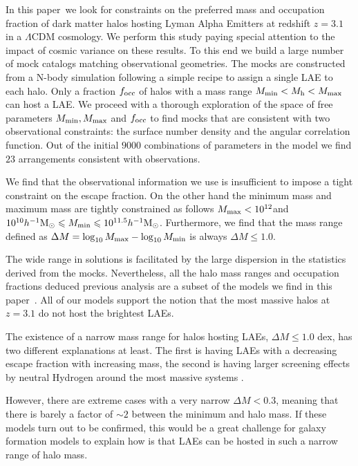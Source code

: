 \documentclass[usenatbib]{mn2e}
\newcommand{\documentname}{paper~}
\newcommand{\ly}{{\ifmmode{{\rm Ly}\alpha}\else{Ly$\alpha$~}\fi}}
\newcommand{\hMsun}{{\ifmmode{h^{-1}{\rm
        {M_{\odot}}}}\else{$h^{-1}{\rm{M_{\odot}}}$}\fi}}
\begin{document}
{In this \documentname we look for constraints on the preferred mass
and occupation fraction of dark matter halos hosting Lyman Alpha Emitters at
redshift $z=3.1$ in a $\Lambda$CDM cosmology. We perform this study
paying special attention to the impact of cosmic variance on these
results. To this end we build a large number of mock catalogs matching
observational geometries. The mocks are constructed from a N-body simulation
following a simple recipe to assign a single LAE to each halo. Only
a fraction $f_{\rm occ}$ of halos with a mass range  $M_{\rm
  min}<M_{\rm h}<M_{\rm   max}$ can host a LAE. We proceed with a
thorough exploration of the space of free parameters $M_{\rm min},
M_{\rm max}$ and $f_{\rm occ}$ to find mocks that are consistent with
two observational constraints: the surface number density and the
angular correlation function. Out of the initial $9000$ 
combinations of parameters in the model we find $23$ arrangements
consistent with observations.

We find that the observational information we use is insufficient to
impose a tight constraint on the escape fraction. On the other hand
the minimum mass and maximum mass are tightly constrained as follows
$M_{\rm max}<10^{12}$\hMsun and $10^{10}\hMsun\leq M_{\rm min}\leq
10^{11.5}\hMsun$. Furthermore, we find that the mass range defined as
$\Delta M=\log_{10}M_{\rm max} - \log_{10}M_{\rm min}$ is always
$\Delta M\leq 1.0$.

The wide range in solutions is facilitated by the large dispersion in
the statistics derived from the mocks. Nevertheless, all the halo mass
ranges and occupation fractions deduced previous analysis
\citep[i.e.][]{Gawiser2007,Ouchi2010} are a subset of the models we
find in this \documentname. All of our models support the notion that
the most massive halos at $z=3.1$ do not host the brightest LAEs.

The existence of a narrow mass range for halos hosting LAEs, $\Delta
M\leq 1.0$ dex, has two different explanations at least. The
first is having LAEs with a decreasing \ly escape fraction with
increasing mass, the second is having larger screening effects by
neutral Hydrogen around the most massive systems
\citep{Laursen2009,ForeroRomero2011}.   

However, there are extreme cases with a very narrow $\Delta M<0.3$, meaning that
there is barely a factor of $\sim 2$ between the minimum and halo
mass. If these models turn out to be confirmed, this would be a great
challenge for galaxy formation models to explain how is that LAEs can
be hosted in such a narrow range of halo mass. 

}
\end{document}
